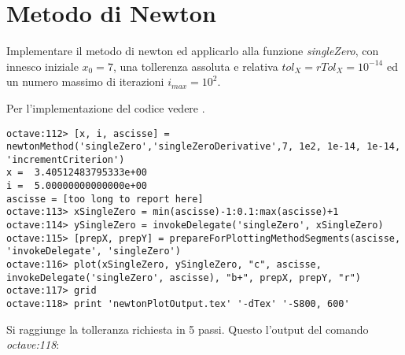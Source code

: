 \section{Metodo di Newton}
\label{sec:metodoDiNewton}

\begin{exercise}
Implementare il metodo di newton ed applicarlo alla funzione \emph{singleZero},
con innesco iniziale $x_{0} = 7$, una tollerenza assoluta e relativa
$tol_{X} = rTol_{X} = 10^{-14}$ ed un numero massimo di iterazioni
$i_{max} = 10^{2}$.
\end{exercise}
Per l'implementazione del codice vedere .
\begin{lstlisting}
octave:112> [x, i, ascisse] = newtonMethod('singleZero','singleZeroDerivative',7, 1e2, 1e-14, 1e-14, 'incrementCriterion') 
x =  3.40512483795333e+00
i =  5.00000000000000e+00
ascisse = [too long to report here]
octave:113> xSingleZero = min(ascisse)-1:0.1:max(ascisse)+1
octave:114> ySingleZero = invokeDelegate('singleZero', xSingleZero)
octave:115> [prepX, prepY] = prepareForPlottingMethodSegments(ascisse, 'invokeDelegate', 'singleZero')
octave:116> plot(xSingleZero, ySingleZero, "c", ascisse, invokeDelegate('singleZero', ascisse), "b+", prepX, prepY, "r")
octave:117> grid
octave:118> print 'newtonPlotOutput.tex' '-dTex' '-S800, 600'
\end{lstlisting}
Si raggiunge la tolleranza richiesta in 5 passi. Questo l'output del comando
\emph{octave:118}:
\begin{center}

\end{center}
